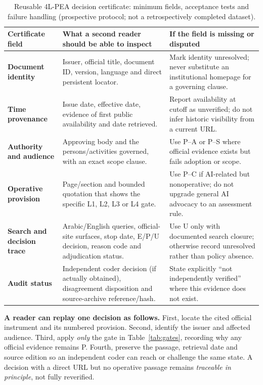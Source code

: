 \documentclass[conference,letterpaper]{IEEEtran}
\begin{document}
\begin{table}[t]
\centering\caption{Reusable 4L-PEA decision certificate: minimum fields, acceptance tests and failure handling (prospective protocol; not a retrospectively completed dataset).}
\label{tab:certificate}\small
\setlength{\tabcolsep}{6pt}
\begin{tabularx}{\textwidth}{@{}p{}p{}X@{}}
\toprule
Certificate field & What a second reader should be able to inspect & If the field is missing or disputed\\\midrule
\textbf{Document identity} & Issuer, official title, document ID, version, language and direct persistent locator. & Mark identity unresolved; never substitute an institutional homepage for a governing clause.\\
\textbf{Time provenance} & Issue date, effective date, evidence of first public availability and date retrieved. & Report availability at cutoff as unverified; do not infer historic visibility from a current URL.\\
\textbf{Authority and audience} & Approving body and the persons/activities governed, with an exact scope clause. & Use P--A or P--S where official evidence exists but fails adoption or scope.\\
\textbf{Operative provision} & Page/section and bounded quotation that shows the specific L1, L2, L3 or L4 gate. & Use P--C if AI-related but nonoperative; do not upgrade general AI advocacy to an assessment rule.\\
\textbf{Search and decision trace} & Arabic/English queries, official-site surfaces, stop date, E/P/U decision, reason code and adjudication status. & Use U only with documented search closure; otherwise record unresolved rather than policy absence.\\
\textbf{Audit status} & Independent coder decision (if actually obtained), disagreement disposition and source-archive reference/hash. & State explicitly ``not independently verified'' where this evidence does not exist.\\
\bottomrule
\end{tabularx}
\end{table}

\textbf{A reader can replay one decision as follows.} First, locate the cited official instrument and its numbered provision. Second, identify the issuer and affected audience. Third, apply \emph{only} the gate in Table~\ref{tab:gates}, recording why any official evidence remains P. Fourth, preserve the passage, retrieval date and source edition so an independent coder can reach or challenge the same state. A decision with a direct URL but no operative passage remains \emph{traceable in principle}, not fully reverified.
\end{document}
